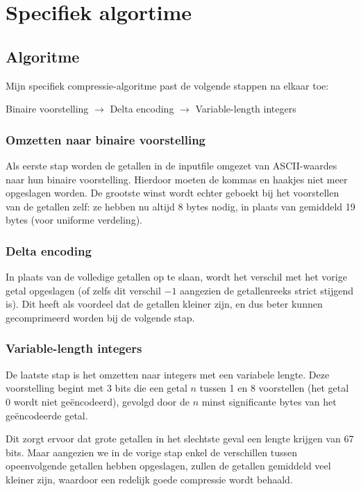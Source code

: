 \documentclass[a4paper]{article}
\begin{document}



\section{Specifiek algortime}

\subsection{Algoritme}

Mijn specifiek compressie-algoritme past de volgende stappen na elkaar toe:

Binaire voorstelling $\rightarrow$ Delta encoding $\rightarrow$ Variable-length integers

\subsubsection{Omzetten naar binaire voorstelling}
Als eerste stap worden de getallen in de inputfile omgezet van ASCII-waardes naar hun binaire voorstelling. Hierdoor moeten de kommas en haakjes niet meer opgeslagen worden. De grootste winst wordt echter geboekt bij het voorstellen van de getallen zelf: ze hebben nu altijd 8 bytes nodig, in plaats van gemiddeld 19 bytes (voor uniforme verdeling).
\subsubsection{Delta encoding}
In plaats van de volledige getallen op te slaan, wordt het verschil met het vorige getal opgeslagen (of zelfs dit verschil $-1$ aangezien de getallenreeks strict stijgend is). Dit heeft als voordeel dat de getallen kleiner zijn, en dus beter kunnen gecomprimeerd worden bij de volgende stap.
\subsubsection{Variable-length integers}
De laatste stap is het omzetten naar integers met een variabele lengte. Deze voorstelling begint met 3 bits die een getal $n$ tussen 1 en 8 voorstellen (het getal 0 wordt niet geëncodeerd), gevolgd door de $n$ minst significante bytes van het geëncodeerde getal.

Dit zorgt ervoor dat grote getallen in het slechtste geval een lengte krijgen van 67 bits. Maar aangezien we in de vorige stap enkel de verschillen tussen opeenvolgende getallen hebben opgeslagen, zullen de getallen gemiddeld veel kleiner zijn, waardoor een redelijk goede compressie wordt behaald.
\end{document}
